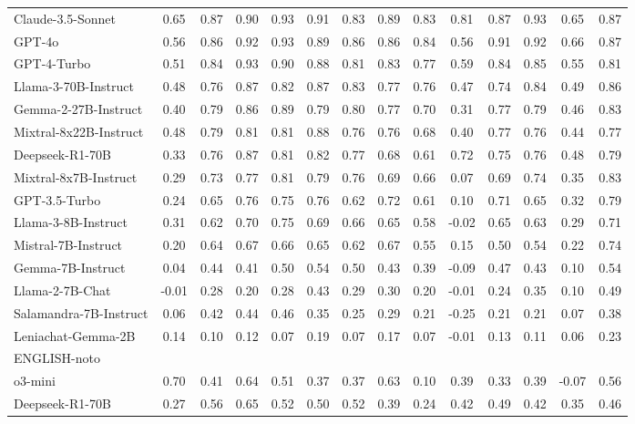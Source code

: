 \begin{table*}[ht]
{\begin{tabular}{lccccccccccccc}
Claude-3.5-Sonnet & 0.65 & 0.87 & 0.90 & 0.93 & 0.91 & 0.83 & 0.89 & 0.83 & 0.81 & 0.87 & 0.93 & 0.65 & 0.87 \\
GPT-4o & 0.56 & 0.86 & 0.92 & 0.93 & 0.89 & 0.86 & 0.86 & 0.84 & 0.56 & 0.91 & 0.92 & 0.66 & 0.87 \\
GPT-4-Turbo & 0.51 & 0.84 & 0.93 & 0.90 & 0.88 & 0.81 & 0.83 & 0.77 & 0.59 & 0.84 & 0.85 & 0.55 & 0.81 \\
Llama-3-70B-Instruct & 0.48 & 0.76 & 0.87 & 0.82 & 0.87 & 0.83 & 0.77 & 0.76 & 0.47 & 0.74 & 0.84 & 0.49 & 0.86 \\
Gemma-2-27B-Instruct & 0.40 & 0.79 & 0.86 & 0.89 & 0.79 & 0.80 & 0.77 & 0.70 & 0.31 & 0.77 & 0.79 & 0.46 & 0.83 \\
Mixtral-8x22B-Instruct & 0.48 & 0.79 & 0.81 & 0.81 & 0.88 & 0.76 & 0.76 & 0.68 & 0.40 & 0.77 & 0.76 & 0.44 & 0.77 \\
Deepseek-R1-70B & 0.33 & 0.76 & 0.87 & 0.81 & 0.82 & 0.77 & 0.68 & 0.61 & 0.72 & 0.75 & 0.76 & 0.48 & 0.79 \\
Mixtral-8x7B-Instruct & 0.29 & 0.73 & 0.77 & 0.81 & 0.79 & 0.76 & 0.69 & 0.66 & 0.07 & 0.69 & 0.74 & 0.35 & 0.83 \\
GPT-3.5-Turbo & 0.24 & 0.65 & 0.76 & 0.75 & 0.76 & 0.62 & 0.72 & 0.61 & 0.10 & 0.71 & 0.65 & 0.32 & 0.79 \\
Llama-3-8B-Instruct & 0.31 & 0.62 & 0.70 & 0.75 & 0.69 & 0.66 & 0.65 & 0.58 & -0.02 & 0.65 & 0.63 & 0.29 & 0.71 \\
Mistral-7B-Instruct & 0.20 & 0.64 & 0.67 & 0.66 & 0.65 & 0.62 & 0.67 & 0.55 & 0.15 & 0.50 & 0.54 & 0.22 & 0.74 \\
Gemma-7B-Instruct & 0.04 & 0.44 & 0.41 & 0.50 & 0.54 & 0.50 & 0.43 & 0.39 & -0.09 & 0.47 & 0.43 & 0.10 & 0.54 \\
Llama-2-7B-Chat & -0.01 & 0.28 & 0.20 & 0.28 & 0.43 & 0.29 & 0.30 & 0.20 & -0.01 & 0.24 & 0.35 & 0.10 & 0.49 \\
Salamandra-7B-Instruct & 0.06 & 0.42 & 0.44 & 0.46 & 0.35 & 0.25 & 0.29 & 0.21 & -0.25 & 0.21 & 0.21 & 0.07 & 0.38 \\
Leniachat-Gemma-2B & 0.14 & 0.10 & 0.12 & 0.07 & 0.19 & 0.07 & 0.17 & 0.07 & -0.01 & 0.13 & 0.11 & 0.06 & 0.23 \\
\midrule
ENGLISH-noto &&&&&&&&&&&\\
\midrule
o3-mini & 0.70 & 0.41 & 0.64 & 0.51 & 0.37 & 0.37 & 0.63 & 0.10 & 0.39 & 0.33 & 0.39 & -0.07 & 0.56 \\
Deepseek-R1-70B & 0.27 & 0.56 & 0.65 & 0.52 & 0.50 & 0.52 & 0.39 & 0.24 & 0.42 & 0.49 & 0.42 & 0.35 & 0.46 \\

\end{tabular}}
\end{table*}
